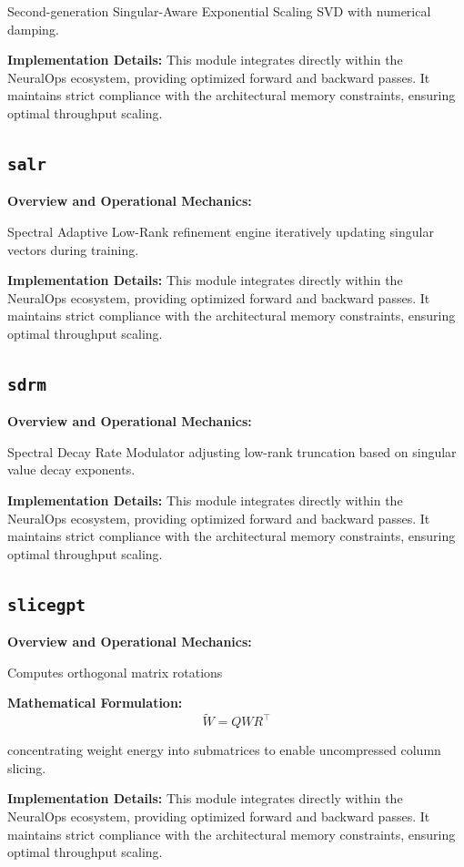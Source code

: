 \documentclass[10pt,twocolumn,letterpaper]{article}
\begin{document}
Second-generation Singular-Aware Exponential Scaling SVD with numerical damping.

\textbf{Implementation Details:}
This module integrates directly within the NeuralOps ecosystem, providing optimized forward and backward passes. It maintains strict compliance with the architectural memory constraints, ensuring optimal throughput scaling.

\subsection{\texttt{salr}}
\textbf{Overview and Operational Mechanics:}

Spectral Adaptive Low-Rank refinement engine iteratively updating singular vectors during training.

\textbf{Implementation Details:}
This module integrates directly within the NeuralOps ecosystem, providing optimized forward and backward passes. It maintains strict compliance with the architectural memory constraints, ensuring optimal throughput scaling.

\subsection{\texttt{sdrm}}
\textbf{Overview and Operational Mechanics:}

Spectral Decay Rate Modulator adjusting low-rank truncation based on singular value decay exponents.

\textbf{Implementation Details:}
This module integrates directly within the NeuralOps ecosystem, providing optimized forward and backward passes. It maintains strict compliance with the architectural memory constraints, ensuring optimal throughput scaling.

\subsection{\texttt{slicegpt}}
\textbf{Overview and Operational Mechanics:}

Computes orthogonal matrix rotations

\textbf{Mathematical Formulation:}
\begin{equation}
\tilde{W} = Q W R^\top
\end{equation}

concentrating weight energy into submatrices to enable uncompressed column slicing.

\textbf{Implementation Details:}
This module integrates directly within the NeuralOps ecosystem, providing optimized forward and backward passes. It maintains strict compliance with the architectural memory constraints, ensuring optimal throughput scaling.
\end{document}

